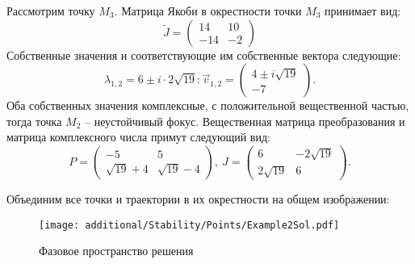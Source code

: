 \begin{enumerate}
				Рассмотрим точку $M_3$. Матрица Якоби в окрестности точки $M_3$ принимает вид:
				\[
					\tilde{J} = \begin{pmatrix}
						14 & 10 \\
						-14 & -2
					\end{pmatrix}
				\]
				Собственные значения и соответствующие им собственные вектора следующие:
				\[ \lambda_{1, 2} = 6 \pm i \cdot 2\sqrt{19}: \vec{v}_{1, 2} = \begin{pmatrix} 4 \pm i \sqrt{19} \\ -7 \end{pmatrix}. \]
				Оба собственных значения комплексные, с положительной вещественной частью, тогда точка $M_2$ -- неустойчивый фокус. Вещественная матрица преобразования и матрица комплексного числа примут следующий вид:
				\[ P = \begin{pmatrix} -5 & 5 \\ \sqrt{19} + 4 & \sqrt{19} - 4 \end{pmatrix}, ~ J = \begin{pmatrix} 6 & -2\sqrt{19} \\ 2\sqrt{19} & 6 \end{pmatrix}. \]

				Объединим все точки и траектории в их окрестности на общем изображении:
				\begin{figure}[H]
					\centering
					\texttt{[image: additional/Stability/Points/Example2Sol.pdf]}
					\caption{Фазовое пространство решения}
					\label{Stability:Example2Sol}
				\end{figure}

		\end{enumerate}

